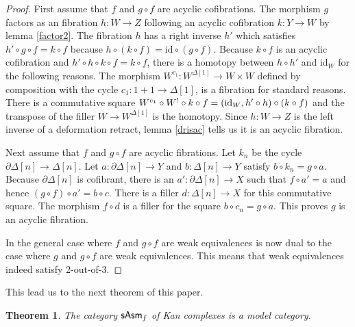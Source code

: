 \documentclass{amsart}
\theoremstyle{plain}
\newtheorem{theorem}{Theorem}
\theoremstyle{definition}
\newcommand\hide[1]{}
\newcommand\id{\mathrm{id}}
\begin{document}
\begin{proof}
First assume that $f$ and $g\circ f$ are acyclic cofibrations. The morphism $g$ factors as an fibration $h:W\to Z$ following an acyclic cofibration $k:Y\to W$ by lemma \ref{factor2}. The fibration $h$ has a right inverse $h'$ which satisfies $h'\circ g\circ f = k\circ f$ because $h\circ (k\circ f) = \id \circ (g\circ f)$. Because $k\circ f$ is an acyclic cofibration and $h'\circ h\circ k\circ f = k\circ f$, there is a homotopy between $h\circ h'$ and $\id_W$ for the following reasons. The morphism $W^{c_1}:W^{\Delta[1]}\to W\times W$ defined by composition with the cycle $c_1:1+1\to\Delta[1]$, is a fibration for standard reasons.  
There is a commutative square $W^{c_1}\circ W^{\bang}\circ k\circ f = (\id_W,h'\circ h)\circ (k\circ f)$ and the transpose of the filler $W\to W^{\Delta[1]}$ is the homotopy. Since $h:W\to Z$ is the left inverse of a deformation retract, lemma \ref{drisac} tells us it is an acyclic fibration.

Next assume that $f$ and $g\circ f$ are acyclic fibrations. Let $k_n$ be the cycle $\partial\Delta[n]\to\Delta[n]$. Let $a:\partial\Delta[n]\to Y$ and $b:\Delta[n]\to Y$ satisfy $b\circ k_n = g \circ a$. Because $\partial\Delta[n]$ is cofibrant, there is an $a':\partial\Delta[n]\to X$ such that $f\circ a' = a$ and hence $(g\circ f)\circ a' = b\circ c$. There is a filler $d:\Delta[n]\to X$ for this commutative square. The morphism $f\circ d$ is a filler for the square $b\circ c_n = g \circ a$. This proves $g$ is an acyclic fibration.

In the general case where $f$ and $g\circ f$ are weak equivalences is now dual to the case where $g$ and $g\circ f$ are weak equivalences. This means that weak equivalences indeed satisfy 2-out-of-3.
\end{proof}

\hide{ Dat pushout products met de punten $1\to \Delta[1]$ acyclische cofibraties is het leeuwendeel van de standaardreden die langskomen.
Aan de andere kant kunnen we de volledige pushout product wellicht middels adjuncties uit de liftings van individuele acyclische cofibraties krijgen.
Pushout product preserves shit\dots preserves veel dankzij adjunctie. Maakt het werken met dependent products ook gemakkelijker.
}


This lead us to the next theorem of this paper.

\begin{theorem} The category $\mathsf{sAsm}_f$ of Kan complexes is a model category.\label{modelcat} \end{theorem}
\end{document}
